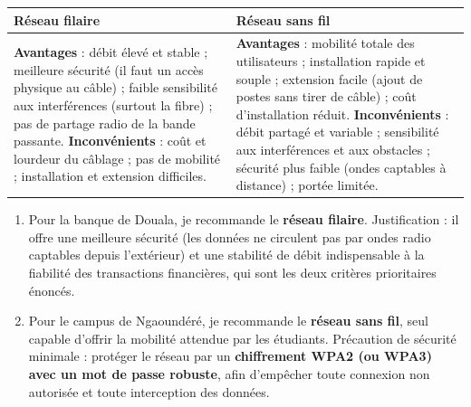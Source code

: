 \documentclass[11pt]{article}
\newcommand{\cle}[1]{{\popxbold\color{popdark}#1}}
\begin{document}
\begin{corrige}
\begin{center}
\begin{tabularx}{\linewidth}{|X|X|}
\hline
\rowcolor{popblueL} \textbf{Réseau filaire} & \textbf{Réseau sans fil} \\
\hline
\textbf{Avantages} : débit élevé et stable ; meilleure \cle{sécurité} (il faut un accès physique au câble) ; faible sensibilité aux interférences (surtout la fibre) ; pas de partage radio de la bande passante. \textbf{Inconvénients} : coût et lourdeur du câblage ; pas de \cle{mobilité} ; installation et extension difficiles. &
\textbf{Avantages} : \cle{mobilité} totale des utilisateurs ; installation rapide et souple ; extension facile (ajout de postes sans tirer de câble) ; coût d'installation réduit. \textbf{Inconvénients} : débit partagé et variable ; sensibilité aux interférences et aux obstacles ; sécurité plus faible (ondes captables à distance) ; portée limitée. \\
\hline
\end{tabularx}
\end{center}
\begin{enumerate}
  \item Pour la banque de Douala, je recommande le \textbf{réseau filaire}. Justification : il offre une meilleure sécurité (les données ne circulent pas par ondes radio captables depuis l'extérieur) et une \cle{stabilité de débit} indispensable à la fiabilité des transactions financières, qui sont les deux critères prioritaires énoncés.
  \item Pour le campus de Ngaoundéré, je recommande le \textbf{réseau sans fil}, seul capable d'offrir la mobilité attendue par les étudiants. Précaution de sécurité minimale : protéger le réseau par un \textbf{chiffrement \cle{WPA2} (ou \cle{WPA3}) avec un mot de passe robuste}, afin d'empêcher toute connexion non autorisée et toute interception des données.
\end{enumerate}
\end{corrige}
\end{document}
